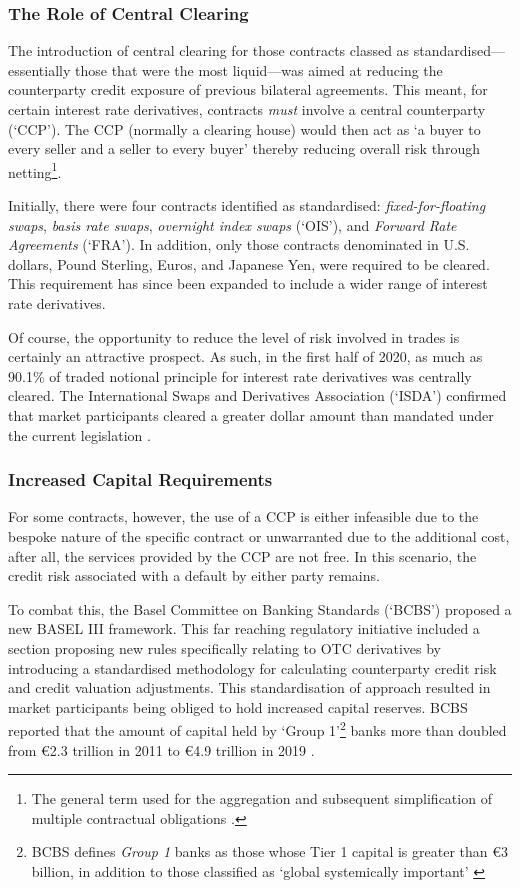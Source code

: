 \subsubsection{The Role of Central Clearing}
The introduction of central clearing for those contracts classed as standardised––essentially those that were the most liquid––was aimed at reducing the counterparty credit exposure of previous bilateral agreements. This meant, for certain interest rate derivatives, contracts \textit{must} involve a central counterparty (`CCP'). The CCP (normally a clearing house) would then act as `a buyer to every seller and a seller to every buyer' thereby reducing overall risk through netting\footnote{The general term used for the aggregation and subsequent simplification of multiple contractual obligations \citep{JSCC}.}. 

Initially, there were four contracts identified as standardised: \textit{fixed-for-floating swaps}, \textit{basis rate swaps}, \textit{overnight index swaps} (`OIS'), and \textit{Forward Rate Agreements} (`FRA'). In addition, only those contracts denominated in U.S. dollars, Pound Sterling, Euros, and Japanese Yen, were required to be cleared. This requirement has since been expanded to include a wider range of interest rate derivatives. 

Of course, the opportunity to reduce the level of risk involved in trades is certainly an attractive prospect. As such, in the first half of 2020, as much as 90.1\% of traded notional principle for interest rate derivatives was centrally cleared. The International Swaps and Derivatives Association (`ISDA') confirmed that market participants cleared a greater dollar amount than mandated under the current legislation \citep{ISDA_Ch2_1}. 

\subsubsection{Increased Capital Requirements}
For some contracts, however, the use of a CCP is either infeasible due to the bespoke nature of the specific contract or unwarranted due to the additional cost, after all, the services provided by the CCP are not free. In this scenario, the credit risk associated with a default by either party remains.

To combat this, the Basel Committee on Banking Standards (`BCBS') proposed a new BASEL III framework. This far reaching regulatory initiative included a section proposing new rules specifically relating to OTC derivatives by introducing a standardised methodology for calculating counterparty credit risk and credit valuation adjustments. This standardisation of approach resulted in market participants being obliged to hold increased capital reserves. BCBS reported that the amount of capital held by `Group 1'\footnote{BCBS defines \textit{Group 1} banks as those whose Tier 1 capital is greater than \euro 3 billion, in addition to those classified as `global systemically important' \citep{BCBS_Ch2_1}} banks more than doubled from \euro 2.3 trillion in 2011 to \euro 4.9 trillion in 2019 \citep{BCBS_Ch2_1}.

